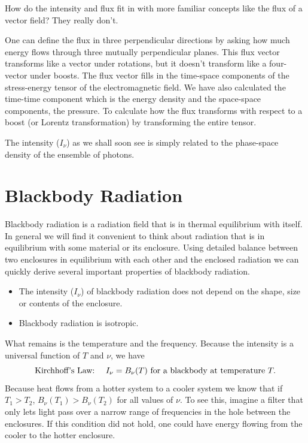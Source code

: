 How do the intensity and flux fit in with more familiar concepts like 
the flux of a vector field?   They really don't.   

One can define the flux in three perpendicular directions by asking
how much energy flows through three mutually perpendicular planes.
This flux vector transforms like a vector under rotations, but it
doesn't transform like a four-vector under boosts.  The flux vector
fills in the time-space components of the stress-energy tensor of the
electromagnetic field.  We have also calculated the time-time component which
is the energy density and the space-space components, the pressure.
To calculate how the flux transforms with respect to a boost (or
Lorentz transformation) by transforming the entire tensor.

The intensity ($I_\nu$) as we shall soon see is simply related to the
phase-space density of the ensemble of photons.

\section{Blackbody Radiation}
\label{sec:blackbody-radiation}
Blackbody radiation is a radiation field that is in thermal
equilibrium with itself.  In general we will find it convenient to
think about radiation that is in equilibrium with some material or its
enclosure.  Using detailed balance between two enclosures in
equilibrium with each other and the enclosed radiation we can quickly
derive several important properties of blackbody radiation.
\begin{itemize}
\item The intensity ($I_\nu$) of blackbody radiation does not depend on the
shape, size or contents of the enclosure.
\item Blackbody radiation is isotropic.
\end{itemize}
What remains is the temperature and the frequency.   Because the
intensity is a universal function of $T$ and $\nu$, we have
\begin{equation}
\hbox{\rm Kirchhoff's Law:}~~~~I_\nu = B_\nu (T)  \hbox{\rm ~for a blackbody at temperature~} T.
\label{eq:20}
\end{equation}
Because heat flows from a hotter system to a cooler system we know 
that if $T_1 > T_2$, $B_\nu (T_1)>B_\nu(T_2)$ for all values of $\nu$.
To see this, imagine a filter that only lets light pass over a narrow
range of frequencies in the hole between the enclosures.  If this
condition did not hold, one could have energy flowing from the cooler
to the hotter enclosure.

